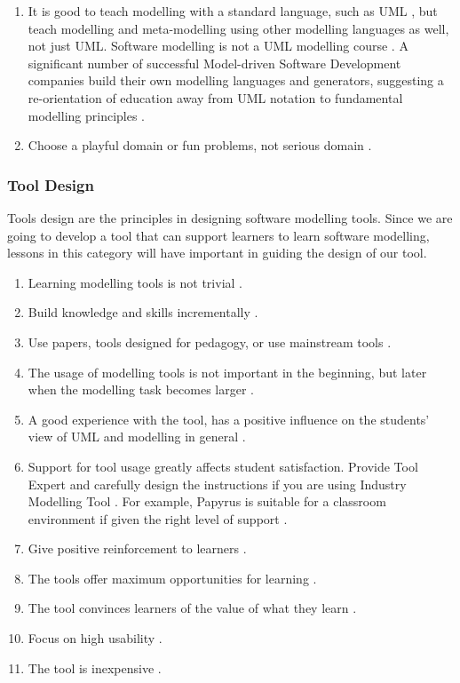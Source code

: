 \documentclass[12pt, a4paper]{report}
\begin{document}
\begin{enumerate}
\item It is good to teach modelling with a standard language, such as UML \cite{bezivin2009teaching}, but teach modelling and meta-modelling using other modelling languages as well, not just UML. Software modelling is not a UML modelling course \cite{paige2014bad}. A significant number of successful Model-driven Software Development companies build their own modelling languages and generators, suggesting a re-orientation of education away from UML notation to fundamental modelling principles \cite{whittle2013industrial}.
\item Choose a playful domain or fun problems, not serious domain \cite{paige2014bad}.
\end{enumerate}

\subsubsection{Tool Design}
Tools design are the principles in designing software modelling tools. Since we are going to develop a tool that can support learners to learn software modelling, lessons in this category will have important in guiding the design of our tool. 
\begin{enumerate}
\item Learning modelling tools is not trivial \cite{paige2014bad}. 
\item Build knowledge and skills incrementally \cite{lethbridge2014teaching}.
\item Use papers, tools designed for pedagogy, or use mainstream tools \cite{Akayama2013}.
\item The usage of modelling tools is not important in the beginning, but later when the modelling task becomes larger \cite{bezivin2009teaching}.
\item A good experience with the tool, has a positive inﬂuence on the students’ view of UML and modelling in general \cite{liebel2015ready}.
\item Support for tool usage greatly affects student satisfaction. Provide Tool Expert and carefully design the instructions if you are using Industry Modelling Tool \cite{liebel2015ready}. For example, Papyrus is suitable for a classroom environment if given the right level of support \cite{liebel2015ready}.
\item Give positive reinforcement to learners \cite{lethbridge2014teaching}.
\item The tools offer maximum opportunities for learning \cite{lethbridge2014teaching}.
\item The tool convinces learners of the value of what they learn \cite{lethbridge2014teaching}.
\item Focus on high usability \cite{lethbridge2014teaching}.
\item The tool is inexpensive \cite{lethbridge2014teaching}.
\end{enumerate}
\end{document}
